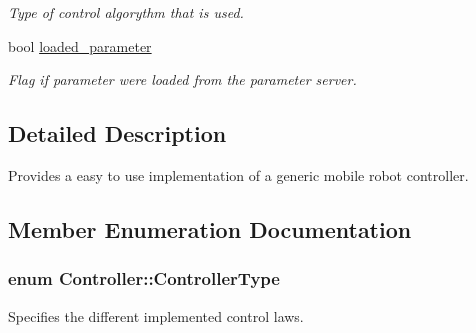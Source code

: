 \begin{DoxyCompactItemize}
\begin{DoxyCompactList}\small\item\em Type of control algorythm that is used. \end{DoxyCompactList}\item 
bool \hyperlink{classController_a4e0e569456498e5670a48244c22cafc9}{loaded\+\_\+parameter}\hypertarget{classController_a4e0e569456498e5670a48244c22cafc9}{}\label{classController_a4e0e569456498e5670a48244c22cafc9}

\begin{DoxyCompactList}\small\item\em Flag if parameter were loaded from the parameter server. \end{DoxyCompactList}\end{DoxyCompactItemize}


\subsection{Detailed Description}
Provides a easy to use implementation of a generic mobile robot controller. 

\subsection{Member Enumeration Documentation}
\subsubsection[{\texorpdfstring{Controller\+Type}{ControllerType}}]{\setlength{\rightskip}{0pt plus 5cm}enum {\bf Controller\+::\+Controller\+Type}}\hypertarget{classController_aa6d956c4c220461a4152415ffa78690a}{}\label{classController_aa6d956c4c220461a4152415ffa78690a}


Specifies the different implemented control laws. 

